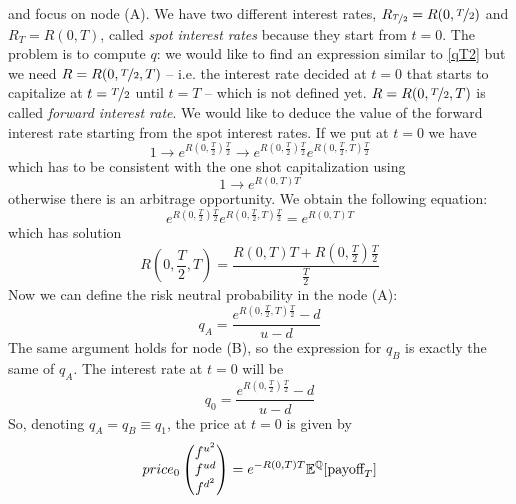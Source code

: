 and focus on node (A). We have two different interest rates, $R_{\nicefrac{T}{2}}=R(0,\nicefrac{T}{2})$ and $R_T=R(0,T)$, called \emph{spot interest rates} because they start from $t=0$. The problem is to compute $q$: we would like to find an expression similar to \eqref{qT2} but we need $R=R(0,\nicefrac{T}{2},T)$ -- i.e. the interest rate decided at $t=0$ that starts to capitalize at $t=\nicefrac{T}{2}$ until $t=T$ -- which is not defined yet. $R=R(0,\nicefrac{T}{2},T)$ is called \emph{forward interest rate}. We would like to deduce the value of the forward interest rate starting from the spot interest rates. If we put  at $t=0$ we have 
\begin{equation*}
    1 \longrightarrow e^{R\left(0,\frac{T}{2}\right)\frac{T}{2}} \longrightarrow e^{R\left(0,\frac{T}{2}\right)\frac{T}{2}}e^{R\left(0,\frac{T}{2},T\right)\frac{T}{2}}
\end{equation*}
which has to be consistent with the one shot capitalization using
\begin{equation*}
    1\longrightarrow e^{R(0,T)T}
\end{equation*}
otherwise there is an arbitrage opportunity. We obtain the following equation:
\begin{equation}\label{equality}
    e^{R\left(0,\frac{T}{2}\right)\frac{T}{2}}e^{R\left(0,\frac{T}{2},T\right)\frac{T}{2}} = e^{R(0,T)T}
\end{equation}
which has solution
\begin{equation}
    R\left(0,\frac{T}{2},T\right) = \dfrac{R(0,T)T + R\left(0,\frac{T}{2}\right)\frac{T}{2}}{\frac{T}{2}}
\end{equation}
Now we can define the risk neutral probability in the node (A):
\begin{equation}
    q_A = \dfrac{e^{R\left(0,\frac{T}{2},T\right)\frac{T}{2}}-d}{u-d} 
\end{equation}
The same argument holds for node (B), so the expression for $q_B$ is exactly the same of $q_A$. The interest rate at $t=0$ will be
\begin{equation}
    q_0 = \dfrac{e^{R\left(0,\frac{T}{2}\right)\frac{T}{2}}-d}{u-d} 
\end{equation}
So, denoting $q_A = q_B \equiv q_1$, the price at $t=0$ is given by
\begin{equation}\label{p00}
    price_0
    \left(
    \begin{matrix}
        f^{u^2} \\ f^{ud} \\ f^{d^2}
    \end{matrix}
    \right) 
    = e^{-R(0,T)T} \mathbb{E}^{\mathbb{Q}}[\mbox{payoff}_T]
\end{equation}
